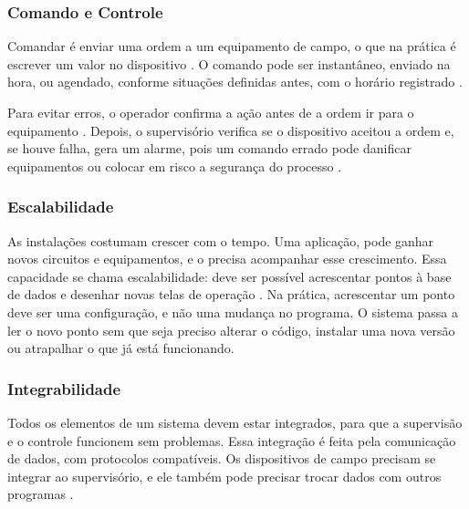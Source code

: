 \subsubsection{Comando e Controle}

\par Comandar é enviar uma ordem a um equipamento de campo, o que na prática é escrever um valor no dispositivo \cite{YADAV2020_SCADA_ARCHITECTURE_REVIEW}. O comando pode ser instantâneo, enviado na hora, ou agendado, conforme situações definidas antes, com o horário registrado \cite{ZANGHI2019_SCADA_CONCEITOS}.

\par Para evitar erros, o operador confirma a ação antes de a ordem ir para o equipamento \cite{ZANGHI2019_SCADA_CONCEITOS}. Depois, o supervisório verifica se o dispositivo aceitou a ordem e, se houve falha, gera um alarme, pois um comando errado pode danificar equipamentos ou colocar em risco a segurança do processo \cite{STOUFFER2015_NIST_ICS_SECURITY}.

\subsubsection{Escalabilidade}

\par As instalações costumam crescer com o tempo. Uma aplicação, pode ganhar novos circuitos e equipamentos, e o  precisa acompanhar esse crescimento. Essa capacidade se chama escalabilidade: deve ser possível acrescentar pontos à base de dados e desenhar novas telas de operação \cite{ZANGHI2019_SCADA_CONCEITOS}. Na prática, acrescentar um ponto deve ser uma configuração, e não uma mudança no programa. O sistema passa a ler o novo ponto sem que seja preciso alterar o código, instalar uma nova versão ou atrapalhar o que já está funcionando.

\subsubsection{Integrabilidade}

\par Todos os elementos de um sistema  devem estar integrados, para que a supervisão e o controle funcionem sem problemas. Essa integração é feita pela comunicação de dados, com protocolos compatíveis. Os dispositivos de campo precisam se integrar ao supervisório, e ele também pode precisar trocar dados com outros programas \cite{ZANGHI2019_SCADA_CONCEITOS}.

